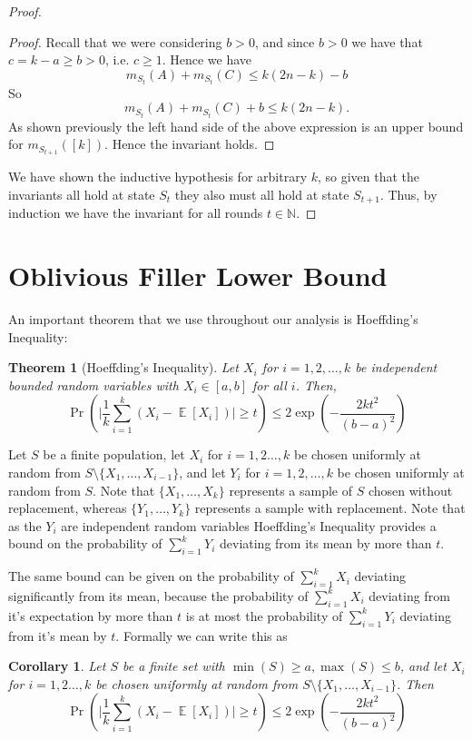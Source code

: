 \documentclass[twocolumn]{article}[10pt]
\DeclareMathOperator{\E}{\mathbb{E}}
\newtheorem{corollary}{Corollary}
\newtheorem{theorem}{Theorem}
\begin{document}
\begin{proof}
\begin{proof}
Recall that we were considering $b> 0$, and since $b>0$ we have that $c = k-a
\ge b > 0$, i.e. $c \ge 1$. 
Hence we have 
$$m_{S_t}(A) + m_{S_t}(C) \le k(2n-k) -b$$
So 
$$m_{S_t}(A) + m_{S_t}(C)+b \le k(2n-k).$$
As shown previously the left hand side of the above expression is an upper
bound for $m_{S_{t+1}}([k])$.
Hence the invariant holds.
  
\end{proof}

We have shown the inductive hypothesis for arbitrary $k$, so given that the
invariants all hold at state $S_t$ they also must all hold at state $S_{t+1}$.
Thus, by induction we have the invariant for all rounds $t\in\mathbb{N}$.
\end{proof}



\section{Oblivious Filler Lower Bound}\label{sec:oblivious}
An important theorem that we use throughout our analysis is Hoeffding's Inequality:
\begin{theorem}[Hoeffding's Inequality]
  Let $X_i$ for $i=1,2,\ldots, k$ be independent bounded random variables with
  $X_i \in [a,b]$ for all $i$. Then,
  $$\Pr\left(\Big|\frac{1}{k} \sum_{i=1}^k (X_i - \E[X_i])\Big|\ge t\right) \le
  2\exp\left(-\frac{2kt^2}{(b-a)^2}\right) $$
\end{theorem}
Let $S$ be a finite population, let $X_i$ for $i=1,2\ldots, k$ be chosen
uniformly at random from $S \setminus \{X_1,\ldots, X_{i-1}\}$, and let $Y_i$
for $i=1,2,\ldots, k$ be chosen uniformly at random from $S$.
Note that $\{X_1,\ldots, X_k\}$ represents a sample of $S$ chosen without
replacement, whereas $\{Y_1,\ldots, Y_k\}$ represents a sample with
replacement. Note that as the $Y_i$ are independent random variables
Hoeffding's Inequality provides a bound on the probability of $\sum_{i=1}^k
Y_i$ deviating from its mean by more than $t$.

The same bound can be given on the probability of $\sum_{i=1}^k X_i$ deviating
significantly from its mean, because the probability of $\sum_{i=1}^k X_i$
deviating from it's expectation by more than $t$ is at most the probability of
$\sum_{i=1}^k Y_i$ deviating from it's mean by $t$.
Formally we can write this as 
\begin{corollary}
  \label{cor:hoeffdingwreplacement}
  Let $S$ be a finite set with $\min(S) \ge a, \max(S) \le b$, and let $X_i$
  for $i=1,2\ldots, k$ be chosen uniformly at random from $S \setminus
  \{X_1,\ldots, X_{i-1}\}$.
Then 
  $$\Pr\left(\Big|\frac{1}{k} \sum_{i=1}^k (X_i - \E[X_i])\Big|\ge t\right) \le
  2\exp\left(-\frac{2kt^2}{(b-a)^2}\right) $$
\end{corollary}
\end{document}
